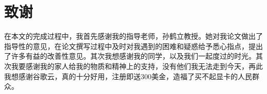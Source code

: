 % 
\section{致谢}
在本文的完成过程中，我首先感谢我的指导老师，孙鹤立教授。她对我论文做出了指导性的意见，在论文撰写过程中及时对我遇到的困难和疑惑给予悉心指点，提出了许多有益的改善性意见。其次我想感谢我的同学，以及我们一起度过的时光。其次我要感谢我的家人给我的物质和精神上的支持，没有他们我无法走到今天，再此我想感谢谷歌云，真的十分好用，注册即送300美金，造福了买不起显卡的人民群众。
% 